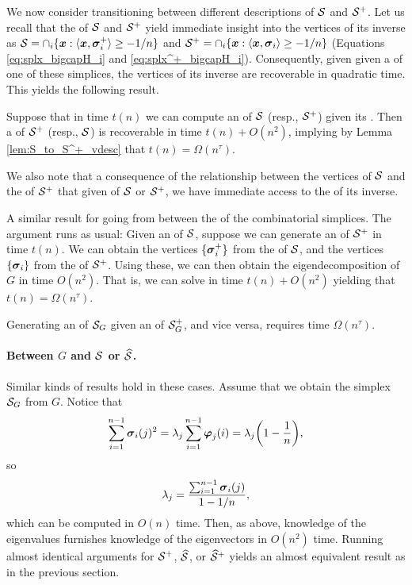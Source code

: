  We now consider transitioning between different descriptions of $\mathcal{S}$ and $\mathcal{S}^+$. Let us recall that the \hdesc of $\mathcal{S}$ and $\mathcal{S}^+$ yield immediate insight into the vertices of its inverse as $\mathcal{S}=\cap_i \{\vb*{x}:\langle \vb*{x},\vb*{\sigma}_i^+\rangle \geq -1/n\}$ and $\mathcal{S}^+=\cap_i\{\vb*{x}:\langle\vb*{x},\vb*{\sigma}_i\rangle \geq -1/n\}$ (Equations \eqref{eq:splx_bigcapH_i} and \eqref{eq:splx^+_bigcapH_i}). Consequently, given given a \hdesc of one of these simplices, the vertices of its inverse are recoverable in quadratic time. This yields the following result. 
 
 \begin{lemma}
 	\label{lem:S_vdesc_to_hdesc}
	 Suppose that in time $t(n)$ we can compute an \hdesc of $\mathcal{S}$ (resp., $\mathcal{S}^+$) given its \vdesc. Then a \vdesc of $\mathcal{S}^+$ (resp., $\mathcal{S}$) is recoverable in time $t(n) + O(n^2)$, implying by Lemma \ref{lem:S_to_S^+_vdesc} that $t(n) = \Omega(n^\tau)$. 
 \end{lemma}

We also note that a consequence of the relationship between the vertices of $\mathcal{S}$ and the \hdesc of $\mathcal{S}^+$ that given \vdesc of $\mathcal{S}$ or $\mathcal{S}^+$, we have immediate access to the \hdesc of its inverse. 

A similar result for going from between the \hdesc of the combinatorial simplices. The argument runs as usual: Given an \hdesc of $\mathcal{S}$, suppose we can generate an \hdesc of $\mathcal{S}^+$ in time $t(n)$. We can obtain the vertices $\{\vb*{\sigma}_i^+\}$ from the \hdesc of $\mathcal{S}$, and the vertices $\{\vb*{\sigma}_i\}$ from the \hdesc of $\mathcal{S}^+$. Using these, we can then obtain the eigendecomposition of $G$ in time $O(n^2)$. That is, we can solve \lapdecomp in time $t(n) + O(n^2)$ yielding that $t(n) = \Omega(n^\tau)$. 

\begin{lemma}
	\label{lem:hdesc_to_hdesc}
	Generating an \hdesc of $\mathcal{S}_G$ given an \hdesc of $\mathcal{S}_G^+$, and vice versa, requires time $\Omega(n^\tau)$. 
\end{lemma}


\paragraph{Between \texorpdfstring{$G$}{the graph} and \texorpdfstring{$\mathcal{S}$ or $\widehat{\mathcal{S}}$}{its simplices}.}
Similar kinds of results hold  in these cases. Assume that we obtain  the simplex $\mathcal{S}_G$ from $G$. Notice  that \[\sum_{i=1}^{n-1}   \vb*{\sigma}_i(j)^2 = \lambda_j \sum_{i=1}^{n-1} \vb*{\varphi}_j(i) = \lambda_j\bigg(1-\frac{1}{n}\bigg),\]
so 
\[\lambda_j = \frac{\sum_{i=1}^{n-1}\vb*{\sigma}_i(j)}{1-1/n},\]
which can be computed  in $O(n)$  time. Then, as above, knowledge of the eigenvalues furnishes knowledge  of the eigenvectors in $O(n^2)$ time. Running almost identical arguments for $\mathcal{S}^+$, $\widehat{\mathcal{S}}$, or $\widehat{\mathcal{S}}^+$ yields an almost equivalent result as in the previous section.  

